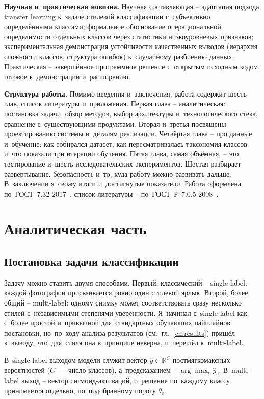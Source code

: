 \documentclass[a4paper,12pt]{diplom}
\newcommand{\R}{\mathbb{R}}
\begin{document}
\textbf{Научная и~практическая новизна.} Научная составляющая -- адаптация подхода transfer learning к~задаче стилевой классификации с~субъективно определёнными классами; формальное обоснование операциональной определимости отдельных классов через статистики низкоуровневых признаков; экспериментальная демонстрация устойчивости качественных выводов (иерархия сложности классов, структура ошибок) к~случайному разбиению данных. Практическая -- завершённое программное решение с~открытым исходным кодом, готовое к~демонстрации и~расширению.

\textbf{Структура работы.} Помимо введения и~заключения, работа содержит шесть глав, список литературы и~приложения. Первая глава -- аналитическая: постановка задачи, обзор методов, выбор архитектуры и~технологического стека, сравнение с~существующими продуктами. Вторая и~третья посвящены проектированию системы и~деталям реализации. Четвёртая глава -- про данные и~обучение: как собирался датасет, как пересматривалась таксономия классов и~что показали три итерации обучения. Пятая глава, самая объёмная, -- это тестирование и~шесть исследовательских экспериментов. Шестая разбирает развёртывание, безопасность и~то, куда работу можно развивать дальше. В~заключении я~свожу итоги и~достигнутые показатели. Работа оформлена по~ГОСТ~7.32-2017~\cite{GOST732}, список литературы -- по~ГОСТ~Р~7.0.5-2008~\cite{GOSTR705}.

\chapter{Аналитическая часть}

\section{Постановка задачи классификации}
\label{sec:problem}

Задачу можно ставить двумя способами. Первый, классический -- single-label: каждой фотографии присваивается ровно один стилевой ярлык. Второй, более общий -- multi-label: одному снимку может соответствовать сразу несколько стилей с~независимыми степенями уверенности. Я~начинал с~single-label как с~более простой и~привычной для~стандартных обучающих пайплайнов постановки, но~по~ходу анализа результатов (см.~гл.~\ref{ch:results}) пришёл к~выводу, что~для~стиля она в~принципе неверна, и~перешёл к~multi-label.

В~single-label выходом модели служит вектор $\hat{y} \in \R^C$ постмягкомаксных вероятностей ($C$~--- число классов), а~предсказанием -- $\arg\max_c \hat{y}_c$. В~multi-label выход -- вектор сигмоид-активаций, и~решение по~каждому классу принимается отдельно, по~подобранному порогу $\theta_c$.
\end{document}
